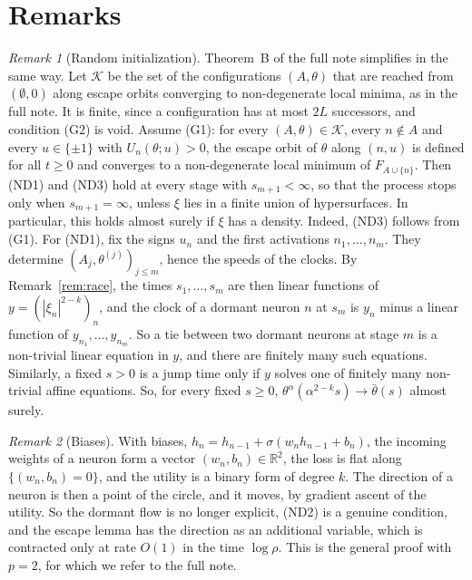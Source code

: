 \documentclass[11pt]{article}
\theoremstyle{definition}
\theoremstyle{remark}
\newtheorem{remark}{Remark}
\newcommand{\R}{\mathbb{R}}
\newcommand{\cK}{\mathcal{K}}
\newcommand{\ND}[1]{\textup{(ND#1)}}
\begin{document}
\section{Remarks}

\begin{remark}[Random initialization]
Theorem~B of the full note simplifies in the same way. Let $\cK$ be the set of the configurations $(A,\theta)$ that are reached from $(\emptyset,0)$ along escape orbits converging to non-degenerate local minima, as in the full note. It is finite, since a configuration has at most $2L$ successors, and condition (G2) is void. Assume (G1): for every $(A,\theta)\in\cK$, every $n\notin A$ and every $u\in\{\pm1\}$ with $U_n(\theta;u)>0$, the escape orbit of $\theta$ along $(n,u)$ is defined for all $t\ge0$ and converges to a non-degenerate local minimum of $F_{A\cup\{n\}}$. Then \ND1 and \ND3 hold at every stage with $s_{m+1}<\infty$, so that the process stops only when $s_{m+1}=\infty$, unless $\xi$ lies in a finite union of hypersurfaces. In particular, this holds almost surely if $\xi$ has a density. Indeed, \ND3 follows from (G1). For \ND1, fix the signs $u_n$ and the first activations $n_1,\dots,n_m$. They determine $(A_j,\theta^{(j)})_{j\le m}$, hence the speeds of the clocks. By Remark~\ref{rem:race}, the times $s_1,\dots,s_m$ are then linear functions of $y=(|\xi_n|^{2-k})_n$, and the clock of a dormant neuron $n$ at $s_m$ is $y_n$ minus a linear function of $y_{n_1},\dots,y_{n_m}$. So a tie between two dormant neurons at stage $m$ is a non-trivial linear equation in $y$, and there are finitely many such equations. Similarly, a fixed $s>0$ is a jump time only if $y$ solves one of finitely many non-trivial affine equations. So, for every fixed $s\ge0$, $\theta^\alpha(\alpha^{2-k}s)\to\bar\theta(s)$ almost surely.
\end{remark}

\begin{remark}[Biases]\label{rem:biases}
With biases, $h_n=h_{n-1}+\sigma(w_nh_{n-1}+b_n)$, the incoming weights of a neuron form a vector $(w_n,b_n)\in\R^2$, the loss is flat along $\{(w_n,b_n)=0\}$, and the utility is a binary form of degree $k$. The direction of a neuron is then a point of the circle, and it moves, by gradient ascent of the utility. So the dormant flow is no longer explicit, \ND2 is a genuine condition, and the escape lemma has the direction as an additional variable, which is contracted only at rate $O(1)$ in the time $\log\rho$. This is the general proof with $p=2$, for which we refer to the full note.
\end{remark}
\end{document}
